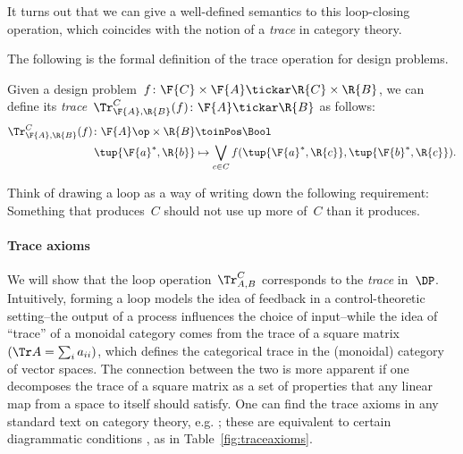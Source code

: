 It turns out that we can give a well-defined semantics to this loop-closing operation, which coincides with the notion of a \emph{trace} in category theory.

The following is the formal definition of the trace operation for design problems.

\begin{definition}
\label{def:dp-trace}
Given a design problem~$f\colon \F{C} \times \F{A} \tickar \R{C} \times \R{B}$, we can define
its \emph{trace}~$\Tr_{\F{A},\R{B}}^C(f) \colon \F{A} \tickar \R{B}$ as follows:
%
\begin{equation}
\label{eq:tracedef}
\begin{aligned}
	\Tr_{\F{A},\R{B}}^C(f) \colon  \F{A}\op \times \R{B} &\toinPos \Bool \\
	\tup{\F{a}^*, \R{b}} &\mapsto \bigvee_{c\in C}
		f(\tup{\F{a}^*, \R{c}},
			\tup{\F{b}^*, \R{c}}).
\end{aligned}
\end{equation}
\end{definition}


Think of drawing a loop as a way of writing down the following requirement: Something that produces~$C$ should not use up more of~$C$ than it produces.


\paragraph{Trace axioms}
We will show that the loop operation~$\Tr_{A,B}^C$ corresponds to the \emph{trace} in~$\DP$. Intuitively, forming a loop models the idea of feedback in a control-theoretic setting--the output of a process influences the choice of input--while the idea of ``trace'' of a monoidal category comes from the trace of a square matrix~$(\Tr A = \sum_i a_{ii})$, which defines the categorical trace in the (monoidal) category of vector spaces. The connection between the two is more apparent if one decomposes the trace of a square matrix as a set of properties that any linear map from a space to itself should satisfy. One can find the trace axioms in any standard text on category theory, e.g. \cite{maclane}; these are equivalent to certain diagrammatic conditions \cite{joyal96}, as in Table~\ref{fig:traceaxioms}.

\begin{table}[h!]
\begin{center}
\end{center}
    \caption{The trace axioms in diagrammatic form \cite{joyal96}.
    \label{fig:traceaxioms}}
\end{table}




